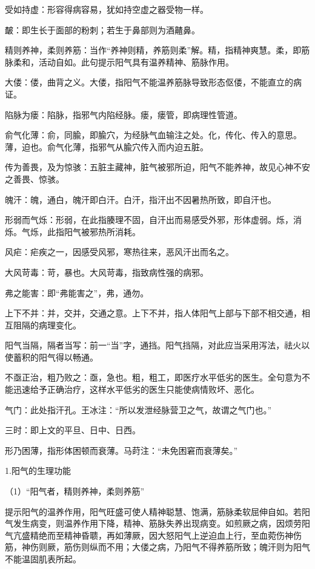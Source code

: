 \documentclass[draft,12pt]{ctexbook}
\begin{document}
\begin{jiaozhu}
	\item 受如持虚：形容得病容易，犹如持空虚之器受物一样。
	\item 皶：即生长于面部的粉刺；若生于鼻部则为酒齄鼻。
	\item 精则养神，柔则养筋：当作“养神则精，养筋则柔”解。精，指精神爽慧。柔，即筋脉柔和，活动自如。此句提示阳气具有温养精神、筋脉作用。
	\item 大偻：偻，曲背之义。大偻，指阳气不能温养筋脉导致形态伛偻，不能直立的病证。
	\item 陷脉为瘘：陷脉，指邪气内陷经脉。瘘，瘘管，即病理性管道。
	\item 俞气化薄：俞，同腧，即腧穴，为经脉气血输注之处。化，传化、传入的意思。薄，迫也。俞气化薄，指邪气从腧穴传入而内迫五脏。
	\item 传为善畏，及为惊骇：五脏主藏神，脏气被邪所迫，阳气不能养神，故见心神不安之善畏、惊骇。
	\item 魄汗：魄，通白，魄汗即白汗。白汗，指汗出不因暑热所致，即自汗也。
	\item 形弱而气烁：形弱，在此指腠理不固，自汗出而易感受外邪，形体虚弱。烁，消烁。气烁，此指阳气被邪热所消耗。
	\item 风疟：疟疾之一，因感受风邪，寒热往来，恶风汗出而名之。
	\item 大风苛毒：苛，暴也。大风苛毒，指致病性强的病邪。
	\item 弗之能害：即“弗能害之”，弗，通勿。
	\item 上下不并：并，交并，交通之意。上下不并，指人体阳气上部与下部不相交通，相互阻隔的病理变化。
	\item 阳气当隔，隔者当写：前一“当”字，通挡。阳气挡隔，对此应当采用泻法，祛火以使蓄积的阳气得以畅通。
	\item 不亟正治，粗乃败之：亟，急也。粗，粗工，即医疗水平低劣的医生。全句意为不能迅速给予正确治疗，这样水平低劣的医生只能使病情败坏、恶化。
	\item 气门：此处指汗孔。王冰注：“所以发泄经脉营卫之气，故谓之气门也。”
	\item 三时：即上文的平旦、日中、日西。
	\item 形乃困薄，指形体困顿而衰薄。马莳注：“未免困窘而衰薄矣。”
\end{jiaozhu}


1.阳气的生理功能

（1）“阳气者，精则养神，柔则养筋”

提示阳气的温养作用，阳气旺盛可使人精神聪慧、饱满，筋脉柔软屈伸自如。若阳气发生病变，则温养作用下降，精神、筋脉失养出现病变。如煎厥之病，因烦劳阳气亢盛精绝而至精神昏聩，再如薄厥，因大怒阳气上逆迫血上行，至血菀伤神伤筋，神伤则厥，筋伤则纵而不用；大偻之病，乃阳气不得养筋所致；魄汗则为阳气不能温固肌表所起。
\end{document}
